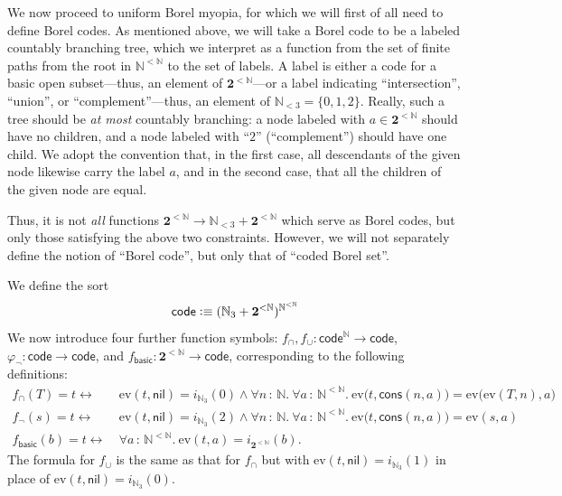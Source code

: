 \documentclass[11pt]{amsart}
\newcommand\basic{\mathsf{basic}}
\newcommand\code{\mathsf{code}}
\newcommand\cons{\mathsf{cons}}
\newcommand\defequiv{\mathrel{\vcenter{\baselineskip0.7ex \lineskiplimit0pt \hbox{.}\hbox{.}}} \equiv}
\newcommand\ev{\mathrm{ev}}
\newcommand{\N}{\mathbb{N}}
\newcommand\nil{\mathsf{nil}}
\newcommand\pbig[1]{\big({#1}\big)}
\renewcommand\phi{\varphi}
\newcommand\set[2][]{#1\{{#2}#1\}}
\newcommand\tolon{{\,:\,}}
\newcommand\tot{\leftrightarrow}
\newcommand\two{\mathbf{2}}
\theoremstyle{definition}
\theoremstyle{remark}
\theoremstyle{plain}
\begin{document}
We now proceed to uniform Borel myopia, for which we will first of all need to define Borel codes.
As mentioned above, we will take a Borel code to be a labeled countably branching tree, which we interpret as a function from the set of finite paths from the root in \( \N^{<\N} \) to the set of labels.
A label is either a code for a basic open subset---thus, an element of \( \two^{<\N} \)---or a label indicating ``intersection'', ``union'', or ``complement''---thus, an element of \( \N_{<3} = \set{0,1,2} \).
Really, such a tree should be \emph{at most} countably branching: a node labeled with \( a \in \two^{<\N} \) should have no children, and a node labeled with ``\( 2 \)'' (``complement'') should have one child.
We adopt the convention that, in the first case, all descendants of the given node likewise carry the label \( a \), and in the second case, that all the children of the given node are equal.

Thus, it is not \emph{all} functions \( \two^{<\N} \to \N_{<3} + \two^{<\N} \) which serve as Borel codes, but only those satisfying the above two constraints.
However, we will not separately define the notion of ``Borel code'', but only that of ``coded Borel set''.

We define the sort
\[
  \code \defequiv
  (\N_{3} + \two^{<\N})^{\N^{<\N}}
\]
We now introduce four further function symbols: \( f_{\cap}, f_\cup \colon \code^\N \to \code \), \( \phi_\neg \colon \code \to \code \), and \( f_{\basic} \colon \two^{<\N} \to \code \), corresponding to the following definitions:
\[
  \begin{split}
    f_{\cap}(T) = t \tot\
    & \ev(t, \nil) = i_{\N_3}(0) \wedge
    \forall n \tolon \N.\ \forall a \tolon \N^{<\N}.\
    \ev\pbig{t, \cons(n, a)} = \ev\pbig{\ev(T, n), a}
    \\
    f_{\neg}(s) = t \tot\
    & \ev(t, \nil) = i_{\N_3}(2) \wedge
    \forall n \tolon \N.\ \forall a \tolon \N^{<\N}.\
      \ev\pbig{t, \cons(n, a)} = \ev(s, a)
    \\
    f_{\basic}(b) = t \tot\ &
    \forall a \tolon \N^{<\N}.\
    \ev(t, a) = i_{\two^{<\N}}(b).
  \end{split}
\]
The formula for \( f_{\cup} \) is the same as that for \( f_\cap \) but with \( \ev(t, \nil) = i_{\N_3}(1) \) in place of \( \ev(t, \nil) = i_{\N_3}(0) \).
\end{document}
